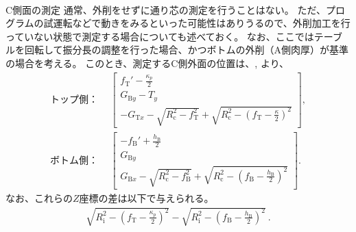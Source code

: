 ~\vfill
\begin{Column}{C側面の測定}
通常、外削をせずに通り芯の測定を行うことはない。
ただ、プログラムの試運転などで動きをみるといった可能性はありうるので、外削加工を行っていない状態で測定する場合についても述べておく。
なお、ここではテーブルを回転して振分長の調整を行った場合、かつボトムの外削（A側肉厚）が基準の場合を考える。
このとき、測定するC側外面の位置は、, より、
\begin{align*}
  \text{トップ側：}~~
  & \left[
    \begin{array}{c}
      \displaystyle f_\mathrm T'-\frac{\kappa_p}2\\[5pt]
      G_{\mathrm By}-T_y\\[3pt]
      \displaystyle
      -G_{\mathrm Tx}
      -\sqrt{R_\mathrm c^2-f_\mathrm T^2}
      +\sqrt{R_\mathrm c^2-\left(f_\mathrm T-\frac\kappa2\right)^2}
    \end{array}
    \right],\\
  \text{ボトム側：}~~
  & \left[
    \begin{array}{c}
      \displaystyle -f_\mathrm B'+\frac{h_\mathrm B}2\\[5pt]
      G_{\mathrm By}\\[3pt]
      \displaystyle
      G_{\mathrm Bx}
      -\sqrt{R_\mathrm c^2-f_\mathrm B^2}
      +\sqrt{R_\mathrm c^2-\left(f_\mathrm B-\frac{h_\mathrm B}2\right)^2}
    \end{array}
    \right].
\end{align*}
なお、これらの$Z$座標の差は以下で与えられる。
\begin{align*}
  \sqrt{R_\mathrm i^2-\left(f_\mathrm T-\frac{\kappa_p}2\right)^2}
  -\sqrt{R_\mathrm i^2-\left(f_\mathrm B-\frac{h_\mathrm B}2\right)^2}~.
\end{align*}
\end{Column}
